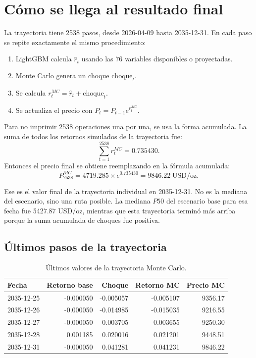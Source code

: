 \documentclass[12pt,letterpaper]{article}
\begin{document}
\section{Cómo se llega al resultado final}
La trayectoria tiene 2538 pasos, desde 2026-04-09 hasta 2035-12-31. En cada paso se repite exactamente el mismo procedimiento:
\begin{enumerate}
    \item LightGBM calcula $\hat{r}_t$ usando las 76 variables disponibles o proyectadas.
    \item Monte Carlo genera un choque $\text{choque}_t$.
    \item Se calcula $r_t^{MC}=\hat{r}_t+\text{choque}_t$.
    \item Se actualiza el precio con $P_t=P_{t-1}e^{r_t^{MC}}$.
\end{enumerate}

Para no imprimir 2538 operaciones una por una, se usa la forma acumulada. La suma de todos los retornos simulados de la trayectoria fue:
\begin{equation}
\sum_{t=1}^{2538}r_t^{MC}=0.735430.
\end{equation}
Entonces el precio final se obtiene reemplazando en la fórmula acumulada:
\begin{equation}
P_{2538}^{MC}=4719.285\times e^{0.735430}=9846.22\;\text{USD/oz}.
\end{equation}

Ese es el valor final de la trayectoria individual en 2035-12-31. No es la mediana del escenario, sino una ruta posible. La mediana $P50$ del escenario base para esa fecha fue 5427.87 USD/oz, mientras que esta trayectoria terminó más arriba porque la suma acumulada de choques fue positiva.

\subsection{Últimos pasos de la trayectoria}
\begin{table}[H]
\centering
\caption{Últimos valores de la trayectoria Monte Carlo.}
\begin{tabular}{lrrrr}
\toprule
Fecha & Retorno base & Choque & Retorno MC & Precio MC \\
\midrule
2035-12-25 & -0.000050 & -0.005057 & -0.005107 & 9356.17 \\
2035-12-26 & -0.000050 & -0.014985 & -0.015035 & 9216.55 \\
2035-12-27 & -0.000050 & 0.003705 & 0.003655 & 9250.30 \\
2035-12-28 & 0.001185 & 0.020016 & 0.021201 & 9448.51 \\
2035-12-31 & -0.000050 & 0.041281 & 0.041231 & 9846.22 \\
\bottomrule
\end{tabular}
\end{table}
\end{document}
